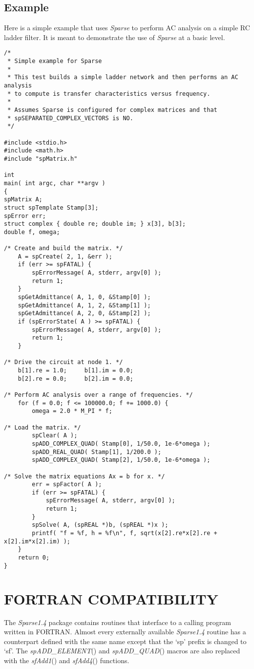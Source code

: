 \documentclass[11pt]{article}
\begin{document}
\subsection{Example}
Here is a simple example that uses \emph{Sparse} to perform AC analysis on a
simple RC ladder filter. It is meant to demonstrate the use of \emph{Sparse}
at a basic level.
\begin{verbatim}
/*
 * Simple example for Sparse
 *
 * This test builds a simple ladder network and then performs an AC analysis
 * to compute is transfer characteristics versus frequency.
 *
 * Assumes Sparse is configured for complex matrices and that
 * spSEPARATED_COMPLEX_VECTORS is NO.
 */

#include <stdio.h>
#include <math.h>
#include "spMatrix.h"

int
main( int argc, char **argv )
{
spMatrix A;
struct spTemplate Stamp[3];
spError err;
struct complex { double re; double im; } x[3], b[3];
double f, omega;

/* Create and build the matrix. */
    A = spCreate( 2, 1, &err );
    if (err >= spFATAL) {
        spErrorMessage( A, stderr, argv[0] );
        return 1;
    }
    spGetAdmittance( A, 1, 0, &Stamp[0] );
    spGetAdmittance( A, 1, 2, &Stamp[1] );
    spGetAdmittance( A, 2, 0, &Stamp[2] );
    if (spErrorState( A ) >= spFATAL) {
        spErrorMessage( A, stderr, argv[0] );
        return 1;
    }

/* Drive the circuit at node 1. */
    b[1].re = 1.0;     b[1].im = 0.0;
    b[2].re = 0.0;     b[2].im = 0.0;

/* Perform AC analysis over a range of frequencies. */
    for (f = 0.0; f <= 100000.0; f += 1000.0) {
        omega = 2.0 * M_PI * f;

/* Load the matrix. */
        spClear( A );
        spADD_COMPLEX_QUAD( Stamp[0], 1/50.0, 1e-6*omega );
        spADD_REAL_QUAD( Stamp[1], 1/200.0 );
        spADD_COMPLEX_QUAD( Stamp[2], 1/50.0, 1e-6*omega );

/* Solve the matrix equations Ax = b for x. */
        err = spFactor( A );
        if (err >= spFATAL) {
            spErrorMessage( A, stderr, argv[0] );
            return 1;
        }
        spSolve( A, (spREAL *)b, (spREAL *)x );
        printf( "f = %f, h = %f\n", f, sqrt(x[2].re*x[2].re + x[2].im*x[2].im) );
    }
    return 0;
}
\end{verbatim}

\section{FORTRAN COMPATIBILITY}
The \emph{Sparse1.4} package contains routines that interface to a
calling program written in FORTRAN.  Almost every externally available
\emph{Sparse1.4} routine has a counterpart defined with the same name 
except that the `sp' prefix is changed to `sf'.  The
\emph{spADD\_ELEMENT}() and \emph{spADD\_QUAD}() macros are also replaced
with the \emph{sfAdd1}() and \emph{sfAdd4}() functions.
\end{document}

